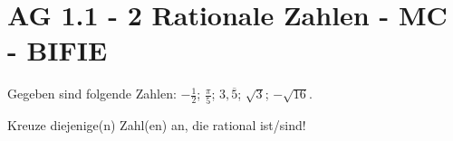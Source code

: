 \section{AG 1.1 - 2 Rationale Zahlen - MC - BIFIE}

\begin{beispiel}[AG 1.1]{1} %
Gegeben sind folgende Zahlen: $-\frac{1}{2}$; $\frac{\pi}{5}$; $3,\overline{5}$; $\sqrt{3}$; $-\sqrt{16}$.

Kreuze diejenige(n) Zahl(en) an, die rational ist/sind!
\end{beispiel}